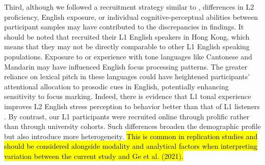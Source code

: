 Third, although we followed a recruitment strategy similar to \cite{ge2021a}, differences in L2 proficiency, English exposure, or individual cognitive-perceptual abilities between participant samples may have contributed to the discrepancies in findings. It should be noted that \cite{ge2021a} recruited their L1 English speakers in Hong Kong, which means that they may not be directly comparable to other L1 English speaking populations. Exposure to or experience with tone languages like Cantonese and Mandarin may have influenced English focus processing patterns. The greater reliance on lexical pitch in these languages could have heightened participants’ attentional allocation to prosodic cues in English, potentially enhancing sensitivity to focus marking. Indeed, there is evidence that L1 tonal experience improves L2 English stress perception to behavior better than that of L1 listeners \parencite{choi2019better, choi2021cantonese}. By contrast, our L1 participants were recruited online through prolific rather than through university cohorts. Such differences broaden the demographic profile but also 
introduce more heterogeneity. \hl{This is common in replication studies and should be considered alongside modality and analytical factors when interpreting variation between the current study and Ge et al. (2021).}


